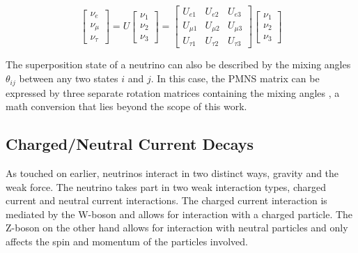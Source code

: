 \documentclass[a4paper,10pt]{scrartcl}
\begin{document}
\begin{equation}
    \begin{bmatrix}
        \nu_{e}   \\
        \nu_{\mu} \\
        \nu_{\tau}
    \end{bmatrix}
    =
    U
    \begin{bmatrix}
        \nu_{1} \\
        \nu_{2} \\
        \nu_{3}
    \end{bmatrix}
    =
    \begin{bmatrix}
        U_{e 1}    & U_{e 2}    & U_{e 3}    \\
        U_{\mu 1}  & U_{\mu 2}  & U_{\mu 3}  \\
        U_{\tau 1} & U_{\tau 2} & U_{\tau 3}
    \end{bmatrix}
    \begin{bmatrix}
        \nu_{1} \\
        \nu_{2} \\
        \nu_{3}
    \end{bmatrix}
\end{equation}

The superposition state of a neutrino can also be described by the mixing angles $\theta_{ij}$ between any two states $i$ and $j$.
In this case, the PMNS matrix can be expressed by three separate rotation matrices containing the mixing angles \cite{warwick}, a math conversion that lies beyond the scope of this work.


\subsection{Charged/Neutral Current Decays}

As touched on earlier, neutrinos interact in two distinct ways, gravity and the weak force.
The neutrino takes part in two weak interaction types, charged current and neutral current interactions.
The charged current interaction is mediated by the W-boson and allows for interaction with a charged particle.
The Z-boson on the other hand allows for interaction with neutral particles and only affects the spin and momentum of the particles involved.
\end{document}

